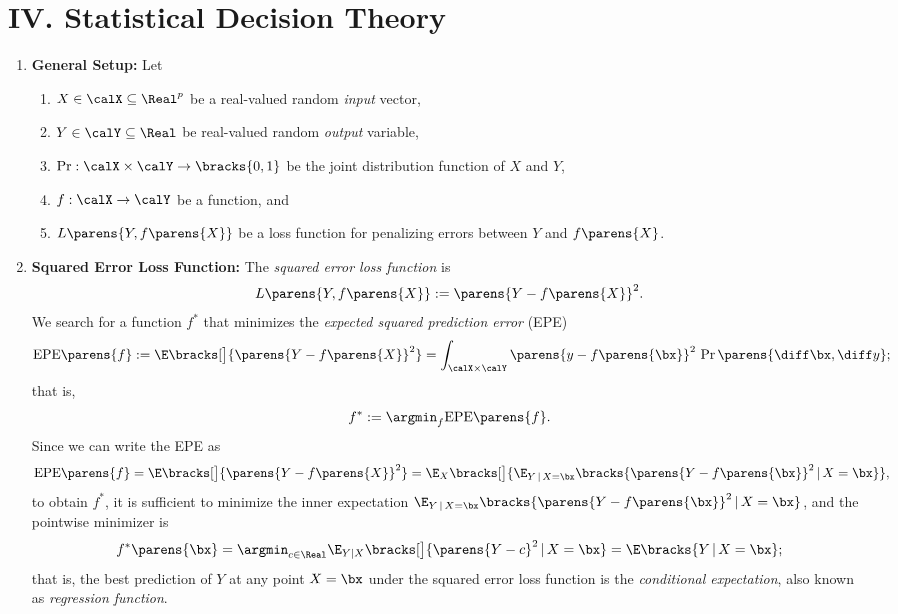 \documentclass[12pt]{article}
\begin{document}
\section*{IV. Statistical Decision Theory}

\begin{enumerate}[label=\textbf{\arabic*.}]
	\item \textbf{General Setup:} Let 
	\begin{enumerate}
		\item $X \in \calX \subseteq \Real^p$ be a real-valued random \textit{input} vector, 
		\item $Y \in \calY \subseteq \Real$ be real-valued random \textit{output} variable, 
		\item $\Pr: \calX \times \calY \to \bracks{0, 1}$ be the joint distribution function of $X$ and $Y$, 
		\item $f: \calX \to \calY$ be a function, and 
		\item $L \parens{Y, f \parens{X}}$ be a loss function for penalizing errors between $Y$ and $f \parens{X}$. 
	\end{enumerate}
	
	\item \textbf{Squared Error Loss Function:} The \emph{squared error loss function} is 
	\begin{align}
		L \parens{Y, f \parens{X}} := \parens{Y - f \parens{X}}^2. 
	\end{align}
	We search for a function $f^*$ that minimizes the \textit{expected squared prediction error} (EPE)
	\begin{equation}
		\mathrm{EPE} \parens{f} := \E \bracks[\big]{\parens{Y - f \parens{X}}^2} = \int_{\calX \times \calY} \parens{y - f \parens{\bx}}^2 \, \Pr \parens{\diff \bx, \diff y}; 
	\end{equation}
	that is, 
	\begin{align*}
		f^* := \argmin_f \mathrm{EPE} \parens{f}. 
	\end{align*}
	Since we can write the EPE as 
	\begin{align*}
		\mathrm{EPE} \parens{f} = \E \bracks[\big]{\parens{Y - f \parens{X}}^2} = \E_{X} \bracks[\big]{\E_{Y \,\vert\, X = \bx} \bracks{\parens{Y - f \parens{\bx}}^2 \,\vert\, X = \bx}}, 
	\end{align*}
	to obtain $f^*$, it is sufficient to minimize the inner expectation $\E_{Y \,\vert\, X = \bx} \bracks{\parens{Y - f \parens{\bx}}^2 \,\vert\, X = \bx}$, and the pointwise minimizer is 
	\begin{equation}
		f^* \parens{\bx} = \argmin_{c \in \Real} \E_{Y \vert X} \bracks[\big]{\parens{Y - c}^2 \,\vert\, X = \bx} = \E \bracks{Y \,\vert\, X = \bx}; 
	\end{equation}
	that is, the best prediction of $Y$ at any point $X = \bx$ under the squared error loss function is the \textit{conditional expectation}, also known as \textit{regression function}. 
	

\end{enumerate}
\end{document}
